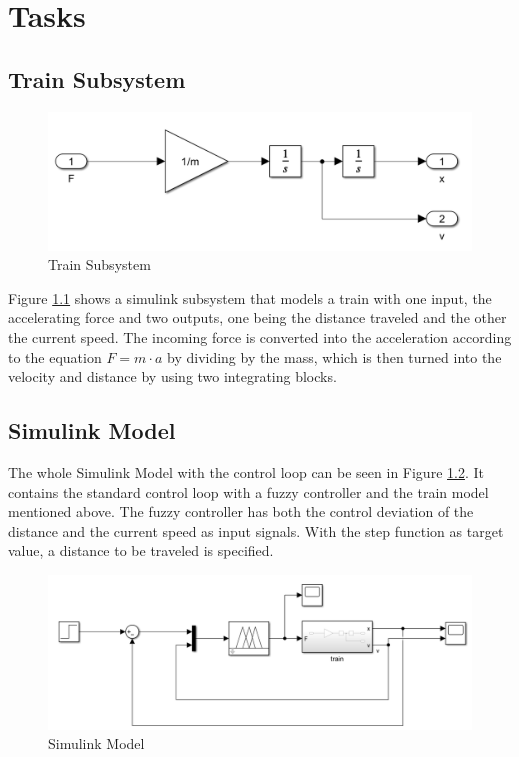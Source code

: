 \chapter{Tasks}


\section{Train Subsystem}


\begin{figure}[h]
	\centering
	\includegraphics[width=0.8\linewidth]{images/train_subsystem.png}
	\caption{Train Subsystem}
	\label{tss}
\end{figure}

Figure \ref{tss} shows a simulink subsystem that models a train with one input, the accelerating force and two outputs, one being the distance traveled and the other the current speed.
The incoming force is converted into the acceleration according to the equation $F = m\cdot a$ by dividing by the mass, which is then turned into the velocity and distance by using two integrating blocks.

\section{Simulink Model}


The whole Simulink Model with the control loop can be seen in Figure \ref{sm}. It contains the standard control loop with a fuzzy controller and the train model mentioned above. The fuzzy controller has both the control deviation of the distance and the current speed as input signals. With the step function as target value, a distance to be traveled is specified.



\newpage
\begin{figure}[h]
	\centering
	\includegraphics[width=1\linewidth]{images/simulink_model.png}
	\caption{Simulink Model}
	\label{sm}
\end{figure}


